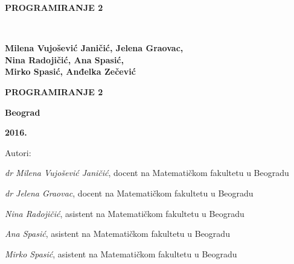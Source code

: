 \pagestyle{empty}

\vspace*{20pt}
\centerline{{\large\bfseries PROGRAMIRANJE 2} \vspace*{2mm}}
\newpage
\verb" "
\newpage
\begin{center}
{\sffamily


\vspace*{1cm}

{\fontsize{16pt}{19pt}\selectfont \bfseries  Milena Vujošević Janičić, Jelena Graovac,\\ Nina Radojičić, Ana Spasić,\\ \vspace*{1.5mm} Mirko Spasić, Anđelka Zečević}

\vspace{50pt}
\centerline{{\huge\bfseries PROGRAMIRANJE 2} \vspace*{2mm}}
\centerline{{\huge\bfseries {\fontsize{22pt}{26pt}\selectfont {Zbirka zadataka sa rešenjima}}}}


\vspace{8cm}

\centerline{{\Large \bfseries Beograd}}
\centerline{{\Large \bfseries 2016.}}

}
\end{center}



\newpage


\small

\noindent
Autori: 

\noindent
{\slshape dr Milena Vujošević Janičić}, docent na Matematičkom fakultetu u Beogradu

\noindent
{\slshape dr Jelena Graovac}, docent na Matematičkom fakultetu u Beogradu

\noindent
{\slshape Nina Radojičić}, asistent na Matematičkom fakultetu u Beogradu

\noindent
{\slshape Ana Spasić}, asistent na Matematičkom fakultetu u Beogradu

\noindent
{\slshape Mirko Spasić}, asistent na Matematičkom fakultetu u Beogradu

